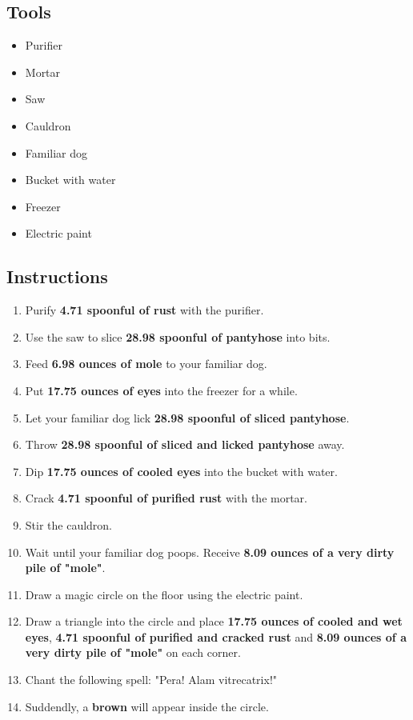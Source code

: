 \documentclass{article}
\begin{document}
\subsection{Tools}\begin{itemize}
\item 
Purifier
\item 
Mortar
\item 
Saw
\item 
Cauldron
\item 
Familiar dog
\item 
Bucket with water
\item 
Freezer
\item 
Electric paint
\end{itemize}
\subsection{Instructions}\begin{enumerate}
\item 
Purify \textbf{4.71 spoonful of rust} with the purifier.
\item 
Use the saw to slice \textbf{28.98 spoonful of pantyhose} into bits.
\item 
Feed \textbf{6.98 ounces of mole} to your familiar dog.
\item 
Put \textbf{17.75 ounces of eyes} into the freezer for a while.
\item 
Let your familiar dog lick \textbf{28.98 spoonful of sliced pantyhose}.
\item 
Throw \textbf{28.98 spoonful of sliced and licked pantyhose} away.
\item 
Dip \textbf{17.75 ounces of cooled eyes} into the bucket with water.
\item 
Crack \textbf{4.71 spoonful of purified rust} with the mortar.
\item 
Stir the cauldron.
\item 
Wait until your familiar dog poops. Receive \textbf{8.09 ounces of a very dirty pile of "mole"}.
\item 
Draw a magic circle on the floor using the electric paint.
\item 
Draw a triangle into the circle and place \textbf{17.75 ounces of cooled and wet eyes}, \textbf{4.71 spoonful of purified and cracked rust} and \textbf{8.09 ounces of a very dirty pile of "mole"} on each corner.
\item 
Chant the following spell: "Pera! Alam vitrecatrix!"
\item 
Suddendly, a \textbf{brown} will appear inside the circle.
\end{enumerate}
\newpage
\end{document}
